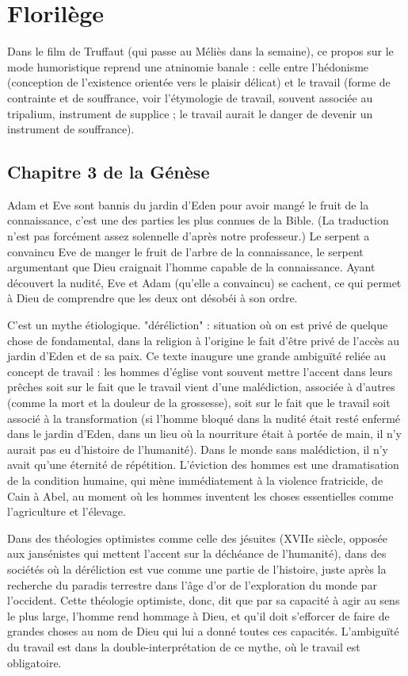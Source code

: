 \documentclass[a4paper,12pt]{book}
\begin{document}
\chapter{Florilège}
Dans le film de Truffaut (qui passe au Méliès dans la semaine), ce propos sur le mode humoristique reprend une atninomie banale : celle entre l'hédonisme (conception de l'existence orientée vers le plaisir délicat) et le travail (forme de contrainte et de souffrance, voir l'étymologie de travail, souvent associée au tripalium, instrument de supplice ; le travail aurait le danger de devenir un instrument de souffrance).
\section{Chapitre 3 de la Génèse}
Adam et Eve sont bannis du jardin d'Eden pour avoir mangé le fruit de la connaissance, c'est une des parties les plus connues de la Bible. (La traduction n'est pas forcément assez solennelle d'après notre professeur.) Le serpent a convaincu Eve de manger le fruit de l'arbre de la connaissance, le serpent argumentant que Dieu craignait l'homme capable de la connaissance. Ayant découvert la nudité, Eve et Adam (qu'elle a convaincu) se cachent, ce qui permet à Dieu de comprendre que les deux ont désobéi à son ordre.
\par C'est un mythe étiologique. "déréliction" : situation où on est privé de quelque chose de fondamental, dans la religion à l'origine le fait d'être privé de l'accès au jardin d'Eden et de sa paix. Ce texte inaugure une grande ambiguïté reliée au concept de travail : les hommes d'église vont souvent mettre l'accent dans leurs prêches soit sur le fait que le travail vient d'une malédiction, associée à d'autres (comme la mort et la douleur de la grossesse), soit sur le fait que le travail soit associé à la transformation (si l'homme bloqué dans la nudité était resté enfermé dans le jardin d'Eden, dans un lieu où la nourriture était à portée de main, il n'y aurait pas eu d'histoire de l'humanité). Dans le monde sans malédiction, il n'y avait qu'une éternité de répétition. L'éviction des hommes est une dramatisation de la condition humaine, qui mène immédiatement à la violence fratricide, de Cain à Abel, au moment où les hommes inventent les choses essentielles comme l'agriculture et l'élevage.
\par Dans des théologies optimistes comme celle des jésuites (XVIIe siècle, opposée aux jansénistes qui mettent l'accent sur la déchéance de l'humanité), dans des sociétés où la déréliction est vue comme une partie de l'histoire, juste après la recherche du paradis terrestre dans l'âge d'or de l'exploration du monde par l'occident. Cette théologie optimiste, donc, dit que par sa capacité à agir au sens le plus large, l'homme rend hommage à Dieu, et qu'il doit s'efforcer de faire de grandes choses au nom de Dieu qui lui a donné toutes ces capacités. L'ambiguïté du travail est dans la double-interprétation de ce mythe, où le travail est obligatoire.
\end{document}
